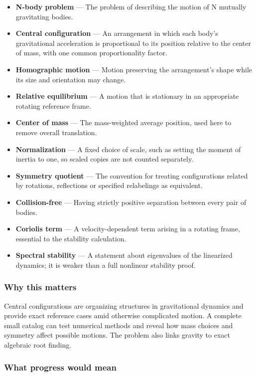 \documentclass[
  11pt,
]{article}
\begin{document}
\begin{itemize}
\item
  \textbf{N-body problem} --- The problem of describing the motion of N
  mutually gravitating bodies.
\item
  \textbf{Central configuration} --- An arrangement in which each body's
  gravitational acceleration is proportional to its position relative to
  the center of mass, with one common proportionality factor.
\item
  \textbf{Homographic motion} --- Motion preserving the arrangement's
  shape while its size and orientation may change.
\item
  \textbf{Relative equilibrium} --- A motion that is stationary in an
  appropriate rotating reference frame.
\item
  \textbf{Center of mass} --- The mass-weighted average position, used
  here to remove overall translation.
\item
  \textbf{Normalization} --- A fixed choice of scale, such as setting
  the moment of inertia to one, so scaled copies are not counted
  separately.
\item
  \textbf{Symmetry quotient} --- The convention for treating
  configurations related by rotations, reflections or specified
  relabelings as equivalent.
\item
  \textbf{Collision-free} --- Having strictly positive separation
  between every pair of bodies.
\item
  \textbf{Coriolis term} --- A velocity-dependent term arising in a
  rotating frame, essential to the stability calculation.
\item
  \textbf{Spectral stability} --- A statement about eigenvalues of the
  linearized dynamics; it is weaker than a full nonlinear stability
  proof.
\end{itemize}

\subsubsection{Why this matters}

Central configurations are organizing structures in gravitational
dynamics and provide exact reference cases amid otherwise complicated
motion. A complete small catalog can test numerical methods and reveal
how mass choices and symmetry affect possible motions. The problem also
links gravity to exact algebraic root finding.

\subsubsection{What progress would mean}
\end{document}
